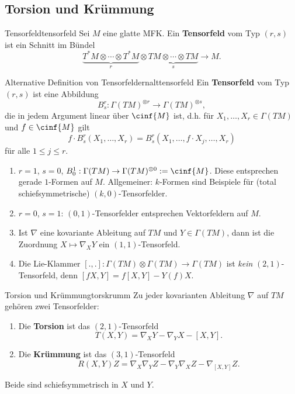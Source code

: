 \subsection{Torsion und Krümmung}
\label{subsec:torsionkrummung}
\begin{definition}{Tensorfeld}{tensorfeld}
Sei $M$ eine glatte MFK. Ein \textbf{Tensorfeld} vom Typ $(r, s)$ ist ein Schnitt im Bündel
\begin{equation}
\underbrace{T^\ast M \otimes \cdots \otimes T^\ast M}_r \otimes \underbrace{ TM \otimes \cdots \otimes TM}_s \to M.
\end{equation}
\end{definition}
\begin{definition}{Alternative Definition von Tensorfeldern}{alttensorfeld}
Ein \textbf{Tensorfeld} vom Typ $(r, s)$ ist eine Abbildung 
\begin{equation}
B^r_s: \Gamma(TM)^{\otimes r} \to \Gamma (TM)^{\otimes s},
\end{equation}
die in jedem Argument linear über $\cinf{M}$ ist, d.h. für $X_1, \dots, X_r \in \Gamma (TM)$ und $f \in \cinf{M}$ gilt
\begin{equation}
f \cdot B^r_s(X_1, \dots, X_r) = B^r_s(X_1, \dots, f \cdot X_j, \dots, X_r)
\end{equation}
für alle $1 \leq j \leq r$.
\end{definition}
\begin{beispiele}
\begin{enumerate}
\item $r=1$, $s=0$, $B^1_0: \Gamma(TM) \to \Gamma (TM)^{\otimes 0} := \cinf{M}$. Diese entsprechen gerade $1$-Formen auf $M$. Allgemeiner: $k$-Formen sind Beispiele für (total schiefsymmetrische) $(k, 0)$-Tensorfelder.
\item $r=0$, $s=1$: $(0,1)$-Tensorfelder entsprechen Vektorfeldern auf $M$.
\item Ist $\nabla$ eine kovariante Ableitung auf $TM$ und $Y \in \Gamma (TM)$, dann ist die Zuordnung $X \mapsto \nabla_X Y$ ein $(1,1)$-Tensorfeld.
\item Die Lie-Klammer $[.,.]: \Gamma (TM) \otimes \Gamma (TM) \to \Gamma (TM)$ ist \textit{kein} $(2,1)$-Tensorfeld, denn $[fX, Y] = f [X, Y] - Y(f) X$.
\end{enumerate}
\end{beispiele}
\begin{definition}{Torsion und Krümmung}{torskrumm}
Zu jeder kovarianten Ableitung $\nabla$ auf $TM$ gehören zwei Tensorfelder:
\begin{enumerate}
\item Die \textbf{Torsion} ist das $(2,1)$-Tensorfeld
\begin{equation}
T(X,Y) = \nabla_X Y - \nabla_Y X - [X,Y].
\end{equation}
\item Die \textbf{Krümmung} ist das $(3,1)$-Tensorfeld
\begin{equation}
R(X,Y)Z = \nabla_X \nabla_Y Z - \nabla_Y \nabla_X Z - \nabla_{[X,Y]} Z.
\end{equation}
\end{enumerate}
Beide sind schiefsymmetrisch in $X$ und $Y$.
\end{definition}
